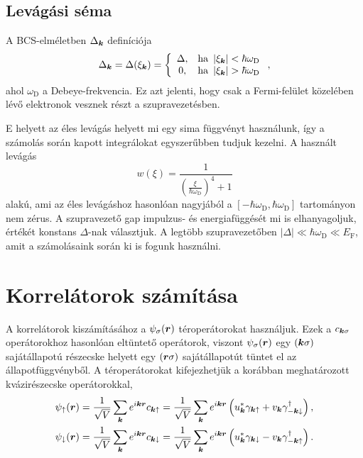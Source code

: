 \documentclass[a4paper,12pt,titlepage]{article}
\newcommand{\KK}{{\vb*{k}}}
\newcommand{\RR}{{\vb*{r}}}
\newcommand{\EF}{{E_\text{F}}}
\begin{document}
\subsection{Levágási séma}

A BCS-elméletben $\Delta_\KK$ definíciója
\begin{equation}
	\Delta_\KK = \Delta(\xi_\KK) = \left\{ \begin{array}{cl} \Delta, & \text{ha } \left| \xi_\KK \right| < \hbar \omega_\text{D} \\ 0, & \text{ha } \left| \xi_\KK \right| > \hbar \omega_\text{D} \end{array} \right. ,
\end{equation}
ahol $\omega_\text{D}$ a Debeye-frekvencia.  Ez azt jelenti, hogy csak a Fermi-felület közelében lévő elektronok vesznek részt a szupravezetésben.

E helyett az éles levágás helyett mi egy sima függvényt használunk, így a számolás során kapott integrálokat egyszerűbben tudjuk kezelni.  A használt levágás
\begin{equation} \label{cutoff}
	w(\xi) = \frac{1}{\left( \frac{\xi}{\hbar \omega_\text{D}} \right)^4 + 1}
\end{equation}
alakú, ami az éles levágáshoz hasonlóan nagyjából a $\left[ -\hbar \omega_\text{D}, \hbar \omega_\text{D} \right]$ tartományon nem zérus. A szupravezető gap impulzus- és energiafüggését mi is elhanyagoljuk, értékét konstans $\Delta$-nak választjuk.  A legtöbb szupravezetőben $\left|\Delta\right| \ll \hbar \omega_\text{D} \ll \EF$, amit a számolásaink során ki is fogunk használni.



\section{Korrelátorok számítása}

A korrelátorok kiszámításához a $\psi_\sigma(\RR)$ téroperátorokat használjuk.  Ezek a $c_{\KK \sigma}$ operátorokhoz hasonlóan eltüntető operátorok, viszont $\psi_\sigma(\RR)$ egy $\left( \KK \sigma \right)$ sajátállapotú részecske helyett egy $\left( \RR \sigma \right)$ sajátállapotút tüntet el az állapotfüggvényből.  A téroperátorokat kifejezhetjük a korábban meghatározott kvázirészecske operátorokkal,
\begin{equation} \label{psi}
\begin{split}
	\psi_\uparrow(\RR) & = \frac{1}{\sqrt{V}} \sum\limits_\KK e^{i \KK \RR} c_{\KK \uparrow} = \frac{1}{\sqrt{V}} \sum\limits_\KK e^{i \KK \RR} \left( u_\KK^* \gamma_{\KK \uparrow} + v_\KK \gamma_{-\KK \downarrow}^\dagger \right), \\
	\psi_\downarrow(\RR) & = \frac{1}{\sqrt{V}} \sum\limits_\KK e^{i \KK \RR} c_{\KK \downarrow} = \frac{1}{\sqrt{V}} \sum\limits_\KK e^{i \KK \RR} \left( u_\KK^* \gamma_{\KK \downarrow} - v_\KK \gamma_{-\KK \uparrow}^\dagger \right).
\end{split}
\end{equation}
\end{document}
